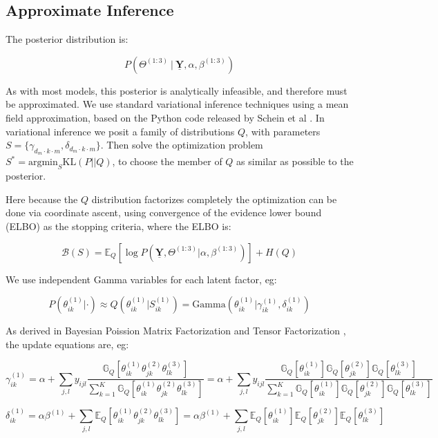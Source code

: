 \documentclass{article}
\newcommand{\tensor}[1]{\ensuremath{\underline{\mathbf{#1}}}}
\begin{document}
\subsection{Approximate Inference}
\label{sec:inference}
The posterior distribution is:

$$P\left(\Theta^{(1:3)} \ |\  \tensor{Y}, \alpha, \beta^{(1:3)} \right)$$

As with most models, this posterior is analytically infeasible, and therefore must be approximated. We use standard variational inference techniques using a mean field approximation, based on the Python code released by Schein et al \cite{schein2015bayesian}. In variational inference we posit a family of distributions $Q$, with parameters $S = \{\gamma_{d_m \cdot k \cdot m}, \delta_{d_m \cdot k \cdot m} \}$. Then solve the optimization problem $S^* = \textrm{argmin}_S \textrm{KL}(P || Q)$, to choose the member of $Q$ as similar as possible to the posterior.

Here because the $Q$ distribution factorizes completely the optimization can be done via coordinate ascent, using convergence of the evidence lower bound (ELBO) as the stopping criteria, where the ELBO is:

$$\mathcal{B}(S) = \mathbb{E}_Q\left[\log P(\tensor{Y}, \Theta^{(1:3)}|\alpha, \beta^{(1:3)})\right] + H(Q)$$

We use independent Gamma variables for each latent factor, eg:

$$P\left(\theta^{(1)}_{ik}|\cdot\right) \approx Q\left(\theta^{(1)}_{ik} | S^{(1)}_{ik}\right) = \textrm{Gamma}\left(\theta^{(1)}_{ik} | \gamma^{(1)}_{ik}, \delta^{(1)}_{ik}\right)$$

As derived in Bayesian Poission Matrix Factorization \cite{cemgil2009bayesian} and Tensor Factorization \cite{schein2015bayesian}, the update equations are, eg:

$$\gamma_{ik}^{(1)} = \alpha + \sum_{j, l} y_{ijl} \frac{\mathbb{G}_Q\left[ \theta_{ik}^{(1)} \theta_{jk}^{(2)} \theta_{lk}^{(3)} \right]}{\sum_{k=1}^K \mathbb{G}_Q\left[ \theta_{ik}^{(1)} \theta_{jk}^{(2)} \theta_{lk}^{(3)} \right]}  = \alpha + \sum_{j, l} y_{ijl} \frac{\mathbb{G}_Q\left[ \theta_{ik}^{(1)} \right] \mathbb{G}_Q\left[\theta_{jk}^{(2)}\right] \mathbb{G}_Q\left[\theta_{lk}^{(3)} \right]}{\sum_{k=1}^K \mathbb{G}_Q\left[ \theta_{ik}^{(1)} \right] \mathbb{G}_Q\left[\theta_{jk}^{(2)}\right] \mathbb{G}_Q\left[\theta_{lk}^{(3)} \right]}$$

$$\delta_{ik}^{(1)} = \alpha\beta^{(1)} + \sum_{j,l} \mathbb{E}_Q \left[ \theta_{ik}^{(1)} \theta_{jk}^{(2)} \theta_{lk}^{(3)} \right] = \alpha\beta^{(1)} + \sum_{j,l} \mathbb{E}_Q\left[ \theta_{ik}^{(1)} \right] \mathbb{E}_Q\left[\theta_{jk}^{(2)}\right] \mathbb{E}_Q\left[\theta_{lk}^{(3)} \right]$$
\end{document}
